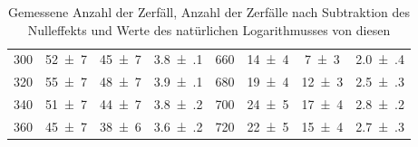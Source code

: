 \begin{table}[!h]
\begin{adjustbox}{width=1\textwidth, center}
\begin{tabular}{|r|c|c|c|r|c|c|c|}
		\num{300} & \num{52(7)} & \num{45(7)} & \num{3.8(1)} & \num{660} & \num{14(4)} & \num{7(3)} & \num{2.0(4)}\\
		\num{320} & \num{55(7)} & \num{48(7)} & \num{3.9(1)} & \num{680} & \num{19(4)} & \num{12(3)} & \num{2.5(3)}\\
		\num{340} & \num{51(7)} & \num{44(7)} & \num{3.8(2)} & \num{700} & \num{24(5)} & \num{17(4)} & \num{2.8(2)}\\
		\num{360} & \num{45(7)} & \num{38(6)} & \num{3.6(2)} & \num{720} & \num{22(5)} & \num{15(4)} & \num{2.7(3)}\\
		\hline
	\end{tabular}
    \end{adjustbox}
	\caption{Gemessene Anzahl der Zerfäll, Anzahl der Zerfälle nach Subtraktion des Nulleffekts und Werte des natürlichen Logarithmusses von diesen \label{tab:Auswertung_Messwerte_Rhodium}}
\end{table}
